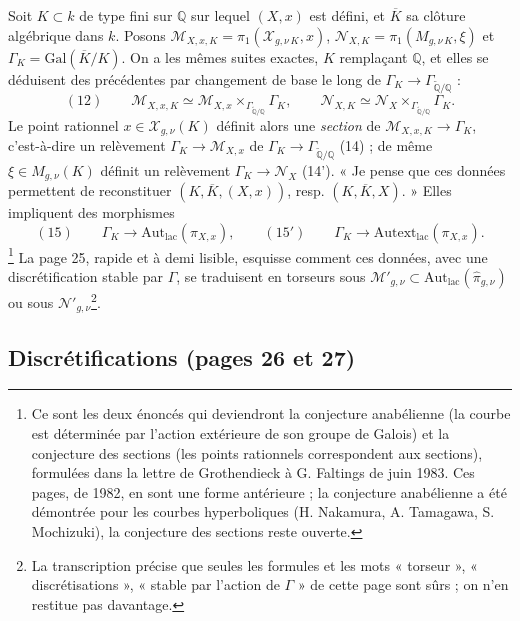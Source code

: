 \documentclass[11pt,a4paper]{article}
\begin{document}
Soit $K \subset k$ de type fini sur $\mathbb{Q}$ sur lequel $(X, x)$ est
défini, et $\overline{K}$ sa clôture algébrique dans $k$. Posons
$\mathcal{M}_{X,x,K} = \pi_1(\mathcal{X}_{g,\nu\,K}, x)$,
$\mathcal{N}_{X,K} = \pi_1(M_{g,\nu\,K}, \xi)$ et
$\Gamma_{K} = \mathrm{Gal}(\overline{K}/K)$. On a les mêmes suites exactes,
$K$ remplaçant $\mathbb{Q}$, et elles se déduisent des précédentes par
changement de base le long de $\Gamma_K \to \Gamma_{\widetilde{\mathbb{Q}}/\mathbb{Q}}$ :
\[
(12)\qquad \mathcal{M}_{X,x,K} \simeq \mathcal{M}_{X,x} \times_{\Gamma_{\widetilde{\mathbb{Q}}/\mathbb{Q}}} \Gamma_K,
\qquad \mathcal{N}_{X,K} \simeq \mathcal{N}_{X} \times_{\Gamma_{\widetilde{\mathbb{Q}}/\mathbb{Q}}} \Gamma_K .
\]
Le point rationnel $x \in \mathcal{X}_{g,\nu}(K)$ définit alors une
\emph{section} de $\mathcal{M}_{X,x,K} \to \Gamma_K$, c'est-à-dire un
relèvement $\Gamma_K \to \mathcal{M}_{X,x}$ de $\Gamma_K \to \Gamma_{\widetilde{\mathbb{Q}}/\mathbb{Q}}$
(14) ; de même $\xi \in M_{g,\nu}(K)$ définit un relèvement
$\Gamma_K \to \mathcal{N}_X$ (14'). « Je pense que ces données permettent de
reconstituer $(K, \overline{K}, (X, x))$, resp. $(K, \overline{K}, X)$. » Elles
impliquent des morphismes
\[
(15)\qquad \Gamma_K \to \mathrm{Aut}_{\mathrm{lac}}(\pi_{X,x}), \qquad
(15')\qquad \Gamma_K \to \mathrm{Autext}_{\mathrm{lac}}(\pi_{X,x}).
\]\footnote{Ce
sont les deux énoncés qui deviendront la conjecture anabélienne (la courbe est
déterminée par l'action extérieure de son groupe de Galois) et la conjecture
des sections (les points rationnels correspondent aux sections), formulées
dans la lettre de Grothendieck à G. Faltings de juin 1983. Ces pages, de
1982, en sont une forme antérieure ; la conjecture anabélienne a été démontrée
pour les courbes hyperboliques (H. Nakamura, A. Tamagawa, S. Mochizuki), la
conjecture des sections reste ouverte.}
La page 25, rapide et à demi lisible, esquisse comment ces données, avec une
discrétification stable par $\Gamma$, se traduisent en torseurs sous
$\mathcal{M}'_{g,\nu} \subset \mathrm{Aut}_{\mathrm{lac}}(\hat\pi_{g,\nu})$ ou
sous $\mathcal{N}'_{g,\nu}$\footnote{La transcription précise que seules les
formules et les mots « torseur », « discrétisations », « stable par l'action de
$\Gamma$ » de cette page sont sûrs ; on n'en restitue pas davantage.}.

\subsection*{Discrétifications (pages 26 et 27)}
\end{document}
